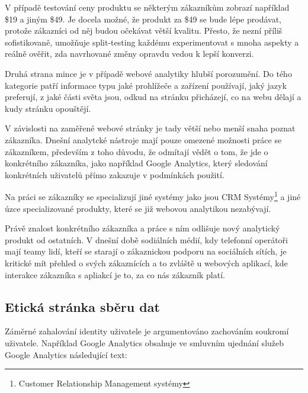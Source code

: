 \documentclass[bc,male,java,dept456]{diploma}						%
\begin{document}
V případě testování ceny produktu se některým zákazníkům zobrazí například \$19 a jiným \$49. Je docela možné, že produkt za \$49 se bude lépe prodávat, protože zákazníci od něj budou očekávat větší kvalitu. Přesto, že nezní příliš sofistikovaně, umožňuje split-testing každému experimentovat s mnoha aspekty a reálně ověřit, zda navrhované změny opravdu vedou k lepší konverzi.




Druhá strana mince je v případě webové analytiky hlubší porozumění. Do tého kategorie patří informace typu jaké prohlížeče a zařízení používají, jaký jazyk preferují, z jaké části světa jsou, odkud na stránku přicházejí, co na webu dělají a kudy stránku opouštějí. 

V závislosti na zaměřené webové stránky je tady větší nebo menší snaha poznat zákazníka. Dnešní analytcké nástroje mají pouze omezené možnosti práce se zákazníkem, především z toho důvodu, že odmítají vědět o tom, že jde o konkrétního zákazníka, jako například Google Analytics, který sledování konkrétních uživatelů přímo zakazuje v podmínkách použití.

Na práci se zákazníky se specializují jiné systémy jako jsou CRM Systémy\footnote{Customer Relationship Management systémy} a jiné úzce specializované produkty, které se již webovou analytikou nezabývají. 

Právě znalost konkrétního zákazníka a práce s ním odlišuje nový analytický produkt od ostatních. V dnešní době sodiálních médií, kdy telefonní operátoři mají teamy lidí, kteří se starají o zákaznickou podporu na sociálních sítích, je kritické mít přehled o svých zákaznících a to zvláště u webových aplikací, kde interakce zákazníka s apliakcí je to, za co nás zákazník platí.



\subsection{Etická stránka sběru dat}

Záměrné zahalování identity uživatele je argumentováno zachováním soukromí u\-ži\-va\-te\-le. Například Google Analytics obsahuje ve smluvním ujednání služeb Google Analytics následující text:
\end{document}
